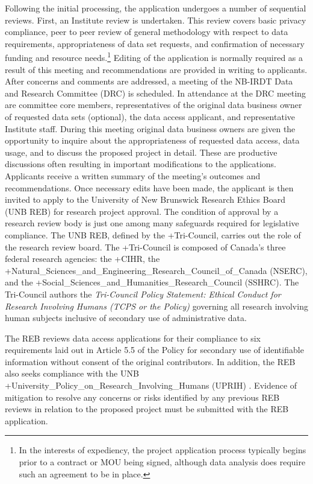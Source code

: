 \documentclass[
]{WileySix}
\begin{document}
Following the initial processing, the application undergoes a number of sequential reviews. First, an Institute review is undertaken. This review covers basic privacy compliance, peer to peer review of general methodology with respect to data requirements, appropriateness of data set requests, and confirmation of necessary funding and resource needs.\footnote{In the interests of expediency, the project application process typically begins prior to a contract or MOU being signed, although data analysis does require such an agreement to be in place.} Editing of the application is normally required as a result of this meeting and recommendations are provided in writing to applicants. After concerns and comments are addressed, a meeting of the NB-IRDT Data and Research Committee (DRC) is scheduled. In attendance at the DRC meeting are committee core members, representatives of the original data business owner of requested data sets (optional), the data access applicant, and representative Institute staff. During this meeting original data business owners are given the opportunity to inquire about the appropriateness of requested data access, data usage, and to discuss the proposed project in detail. These are productive discussions often resulting in important modifications to the applications. Applicants receive a written summary of the meeting's outcomes and recommendations. Once necessary edits have been made, the applicant is then invited to apply to the University of New Brunswick Research Ethics Board (UNB REB) for research project approval. The condition of approval by a research review body is just one among many safeguards required for legislative compliance. The UNB REB, defined by the +Tri-Council\textbar, carries out the role of the research review board. The +Tri-Council\textbar{} is composed of Canada's three federal research agencies: the +CIHR\textbar, the +Natural\_Sciences\_and\_Engineering\_Research\_Council\_of\_Canada\textbar{} (NSERC), and the +Social\_Sciences\_and\_Humanities\_Research\_Council\textbar{} (SSHRC). The Tri-Council authors the \emph{Tri-Council Policy Statement: Ethical Conduct for Research Involving Humans (TCPS or the Policy)} \citep{governmentofcanadainteragencyadvisorypanelonresearchethics2020} governing all research involving human subjects inclusive of secondary use of administrative data.

The REB reviews data access applications for their compliance to six requirements laid out in Article 5.5 of the Policy for secondary use of identifiable information without consent of the original contributors. In addition, the REB also seeks compliance with the UNB +University\_Policy\_on\_Research\_Involving\_Humans\textbar{} (UPRIH) \citep{officeofresearchservicesuniversityofnewbrunswick2011}. Evidence of mitigation to resolve any concerns or risks identified by any previous REB reviews in relation to the proposed project must be submitted with the REB application.
\end{document}
